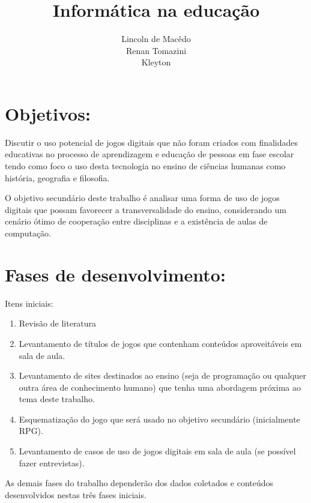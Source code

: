 \documentclass[10pt,a4paper]{article}
\author{Lincoln de Macêdo\\
		Renan Tomazini\\
		Kleyton}
\title{Informática na educação}
\begin{document}
	
	\maketitle
	
	\section*{Objetivos:}
	Discutir o uso potencial de jogos digitais que não foram criados com finalidades educativas no processo de aprendizagem e educação de pessoas em fase escolar tendo como foco o uso desta tecnologia no ensino de ciências humanas como história, geografia e filosofia.
	
	O objetivo secundário deste trabalho é analisar uma forma de uso de jogos digitais que possam favorecer a transversalidade do ensino, considerando um cenário ótimo de cooperação entre disciplinas e a existência de aulas de computação.
	
	\section*{Fases de desenvolvimento:}
	Itens iniciais:
	
	\begin{enumerate}
		
		\item Revisão de literatura
		
		\item Levantamento de títulos de jogos que contenham conteúdos aproveitáveis em sala de aula.
		
		\item Levantamento de sites destinados ao ensino (seja de programação ou qualquer outra área de conhecimento humano) que tenha uma abordagem próxima ao tema deste trabalho.
		
		\item Esquematização do jogo que será usado no objetivo secundário (inicialmente RPG).
		
		\item Levantamento de casos de uso de jogos digitais em sala de aula (se possível fazer entrevistas).
		
	\end{enumerate}
	
	As demais fases do trabalho dependerão dos dados coletados e conteúdos desenvolvidos nestas três fases iniciais.
	
\end{document}
